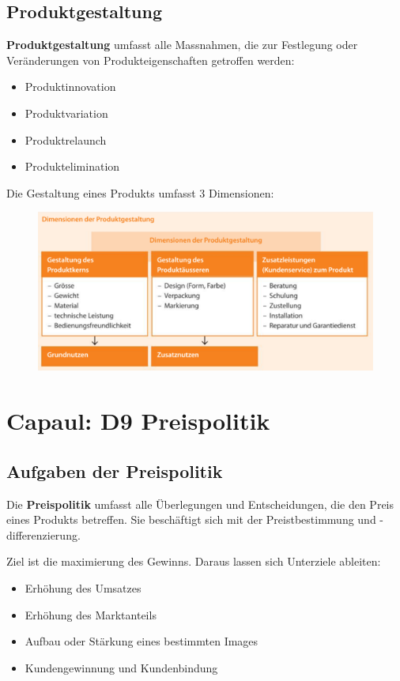 \documentclass[12pt]{article}
\begin{document}
\subsection{Produktgestaltung}
\textbf{Produktgestaltung} umfasst alle Massnahmen, die zur Festlegung oder Veränderungen von Produkteigenschaften getroffen werden:
\begin{itemize}
    \item Produktinnovation
    \item Produktvariation
    \item Produktrelaunch
    \item Produktelimination
\end{itemize}
Die Gestaltung eines Produkts umfasst 3 Dimensionen:
\begin{figure}[h]
    \begin{center}
        \includegraphics[scale=0.4]{Dimensionen der Produktgestaltung.png}
    \end{center}
\end{figure}

\section{Capaul: D9 Preispolitik}
\subsection{Aufgaben der Preispolitik}
\begin{Definitionsbox}
    Die \textbf{Preispolitik} umfasst alle Überlegungen und Entscheidungen, die den Preis eines Produkts betreffen. Sie beschäftigt sich mit der Preistbestimmung und -differenzierung.
\end{Definitionsbox}
Ziel ist die maximierung des Gewinns. Daraus lassen sich Unterziele ableiten:
\begin{itemize}
    \item Erhöhung des Umsatzes
    \item Erhöhung des Marktanteils
    \item Aufbau oder Stärkung eines bestimmten Images
    \item Kundengewinnung und Kundenbindung
\end{itemize}
\end{document}
